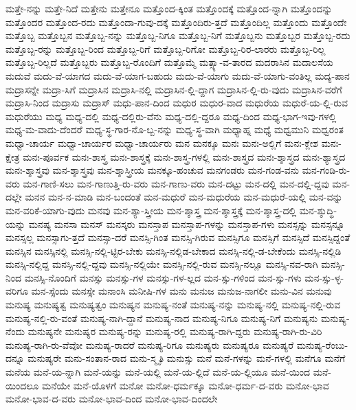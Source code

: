 {ಮತ್ತೇ-ನನ್ನು
ಮತ್ತೇ-ನಿದೆ
ಮತ್ತೇನು
ಮತ್ತೇನೂ
ಮತ್ತೊಂದ-ಕ್ಕಿಂತ
ಮತ್ತೊಂದಕ್ಕೆ
ಮತ್ತೊಂದ-ನ್ನಾಗಿ
ಮತ್ತೊಂದನ್ನು
ಮತ್ತೊಂದರ
ಮತ್ತೊಂದ-ರದು
ಮತ್ತೊಂದಾ-ಗುವು-ದಕ್ಕೆ
ಮತ್ತೊಂದಿರು-ತ್ತದೆ
ಮತ್ತೊಂದಿಲ್ಲ
ಮತ್ತೊಂದು
ಮತ್ತೊಂದೇ
ಮತ್ತೊಬ್ಬ
ಮತ್ತೊಬ್ಬನ
ಮತ್ತೊಬ್ಬ-ನನ್ನು
ಮತ್ತೊಬ್ಬ-ನಿಗೂ
ಮತ್ತೊಬ್ಬ-ನಿಗೆ
ಮತ್ತೊಬ್ಬನು
ಮತ್ತೊಬ್ಬರ
ಮತ್ತೊಬ್ಬ-ರದು
ಮತ್ತೊಬ್ಬ-ರನ್ನು
ಮತ್ತೊಬ್ಬ-ರಿಂದ
ಮತ್ತೊಬ್ಬ-ರಿಗೆ
ಮತ್ತೊಬ್ಬ-ರಿಗೋ
ಮತ್ತೊಬ್ಬ-ರಿರ-ಲಾರರು
ಮತ್ತೊಬ್ಬ-ರಿಲ್ಲ
ಮತ್ತೊಬ್ಬ-ರಿಲ್ಲದೆ
ಮತ್ತೊಬ್ಬರು
ಮತ್ತೊಬ್ಬ-ರೊಂದಿಗೆ
ಮತ್ತೊಮ್ಮೆ
ಮತ್ಸ್ಯಾ-ವ-ತಾರದ
ಮದರಾಸಿನ
ಮದಾಲಸೆಯ
ಮದುವೆ
ಮದು-ವೆ-ಯಾಗದ
ಮದು-ವೆ-ಯಾಗ-ಬಹುದು
ಮದು-ವೆ-ಯಾಗು
ಮದು-ವೆ-ಯಾಗು-ವಂತಿಲ್ಲ
ಮದ್ಯ-ಪಾನ
ಮದ್ರಾಸನ್ನೇ
ಮದ್ರಾ-ಸಿಗೆ
ಮದ್ರಾಸಿನ
ಮದ್ರಾಸಿ-ನಲ್ಲಿ
ಮದ್ರಾಸಿನ-ಲ್ಲಿ-ದ್ದಾಗ
ಮದ್ರಾಸಿನ-ಲ್ಲಿ-ರು-ವುದು
ಮದ್ರಾಸಿನ-ವರೆಗೆ
ಮದ್ರಾಸಿ-ನಿಂದ
ಮದ್ರಾಸು
ಮದ್ರಾಸ್
ಮಧು-ಪಾನ-ದಿಂದ
ಮಧುರ
ಮಧುರ-ವಾದ
ಮಧುರೆಯ
ಮಧುರೆ-ಯ-ಲ್ಲಿ-ರುವ
ಮಧುರೆಯು
ಮಧ್ಯ
ಮಧ್ಯ-ದಲ್ಲಿ
ಮಧ್ಯ-ದಲ್ಲಿರು-ವೆನು
ಮಧ್ಯ-ದಲ್ಲಿ-ದ್ದರೂ
ಮಧ್ಯ-ದಿಂದ
ಮಧ್ಯ-ಭಾಗ-ಇವು-ಗಳಲ್ಲಿ
ಮಧ್ಯ-ಮ-ವಾದು-ದೆಂದರೆ
ಮಧ್ಯ-ಸ್ಥ-ಗಾರ-ನೊ-ಬ್ಬ-ನನ್ನು
ಮಧ್ಯ-ಸ್ಥ-ವಾಗಿ
ಮಧ್ಯಾಹ್ನ
ಮಧ್ಯೆ
ಮಧ್ವಮುನಿ
ಮಧ್ವರಂತ
ಮಧ್ವಾ-ಚಾರ್ಯ
ಮಧ್ವಾ-ಚಾರ್ಯರ
ಮಧ್ವಾ-ಚಾರ್ಯರು
ಮನ
ಮನಕ್ಕೂ
ಮನಃ
ಮನಃ-ಅಲ್ಲಿಗೆ
ಮನಃ-ಕ್ಲೇಶ
ಮನಃ-ಕ್ಷೇತ್ರ
ಮನಃ-ಪೂರ್ವಕ
ಮನಃ-ಶಾಸ್ತ್ರ
ಮನಃ-ಶಾಸ್ತ್ರಕ್ಕೆ
ಮನಃ-ಶಾಸ್ತ್ರ-ಗಳಲ್ಲಿ
ಮನಃ-ಶಾಸ್ತ್ರದ
ಮನಃ-ಶ್ಶಾಸ್ತ್ರದ
ಮನಃ-ಶ್ಯಾಸ್ತ್ರದ
ಮನಃ-ಶ್ಶಾಸ್ತ್ರವು
ಮನ-ಶ್ಶಾಸ್ತ್ರವು
ಮನ-ಶ್ಶಾಸ್ತ್ರೀಯ
ಮನಕ್ಕೂ-ಹಂಚುವ
ಮನಗಂಡರು
ಮನ-ಗಂಡ-ವನು
ಮನ-ಗಂಡಿ-ರು-ವರು
ಮನ-ಗಾಣಿ-ಸಲು
ಮನ-ಗಾಣುತ್ತಿ-ರು-ವರು
ಮನ-ಗಾಣು-ವರು
ಮನ-ದಟ್ಟು
ಮನ-ದಲ್ಲಿ
ಮನ-ದಲ್ಲಿ-ದ್ದವು
ಮನ-ದಲ್ಲೇ
ಮನನ
ಮನ-ನ-ಮಾಡಿ
ಮನ-ಬಂದಂತೆ
ಮನ-ಮಧುರೆ
ಮನ-ಮಧುರೆಯ
ಮನ-ಮಧುರೆ-ಯಲ್ಲಿ
ಮನ-ವನ್ನು
ಮನ-ವರಿಕೆ-ಯಾಗು-ವುದು
ಮನವು
ಮನ-ಶ್ಯಾ-ಸ್ತ್ರೀಯ
ಮನ-ಶ್ಶಾಸ್ತ್ರ
ಮನ-ಶ್ಶಾಸ್ತ್ರಕ್ಕೆ
ಮನ-ಶ್ಶಾಸ್ತ್ರ-ದಲ್ಲಿ
ಮನ-ಶ್ಶುದ್ಧಿ-ಯನ್ನು
ಮನಷ್ಯ
ಮನಸಾ
ಮನಸ್
ಮನಸ್ಕರು
ಮನಸ್ತಾಪ
ಮನಸ್ತಾಪ-ಗಳನ್ನು
ಮನಸ್ತಾಪ-ಗಳು
ಮನಸ್ಸನ್ನು
ಮನಸ್ಸನ್ನೂ
ಮನಸ್ಸಲ್ಲ
ಮನಸ್ಸಾಗು-ತ್ತದೆ
ಮನಸ್ಸಾ-ದರೆ
ಮನಸ್ಸಿ-ಗಿಂತ
ಮನಸ್ಸಿ-ಗಿರುವ
ಮನಸ್ಸಿಗೂ
ಮನಸ್ಸಿಗೆ
ಮನಸ್ಸಿದೆ
ಮನಸ್ಸಿದ್ದಂತೆ
ಮನಸ್ಸಿನ
ಮನಸ್ಸಿನಲ್ಲಿ
ಮನಸ್ಸಿ-ನಲ್ಲಿ-ಟ್ಟಿರ-ಬೇಕು
ಮನಸ್ಸಿ-ನಲ್ಲಿಡ-ಬೇಕಾದ
ಮನಸ್ಸಿ-ನಲ್ಲಿ-ಡ-ಬೇಕೆಂದು
ಮನಸ್ಸಿ-ನಲ್ಲಿಡಿ
ಮನಸ್ಸಿ-ನಲ್ಲಿದ್ದ
ಮನಸ್ಸಿ-ನಲ್ಲಿ-ದ್ದವು
ಮನಸ್ಸಿ-ನಲ್ಲಿಯೇ
ಮನಸ್ಸಿ-ನಲ್ಲಿ-ರುವ
ಮನಸ್ಸಿ-ನಲ್ಲೂ
ಮನಸ್ಸಿ-ನವ-ರಾಗಿ
ಮನಸ್ಸಿ-ನಿಂದ
ಮನಸ್ಸಿ-ನೊಂದಿಗೆ
ಮನಸ್ಸು
ಮನಸ್ಸು-ಗಳ
ಮನಸ್ಸು-ಗಳ-ಲ್ಲದ
ಮನ-ಸ್ಸು-ಗಳಿಂದ
ಮನ-ಸ್ಸು-ಗಳು
ಮನ-ಸ್ಸು-ಳ್ಳ-ವರಿಗೂ
ಮನ-ಸ್ಸೆಂದು
ಮನಸ್ಸೇ
ಮನಾಂಸಿ
ಮನೀಷಿ-ಗಳ
ಮನು
ಮನುಜ
ಮನುಜ-ನಾಗಲೀ
ಮನು-ವಿನ
ಮನುವು
ಮನುಷ್ಯ
ಮನುಷ್ಯತ್ವ
ಮನುಷ್ಯತ್ವಂ
ಮನುಷ್ಯನ
ಮನುಷ್ಯ-ನಂತೆ
ಮನುಷ್ಯ-ನನ್ನು
ಮನುಷ್ಯ-ನಲ್ಲಿ
ಮನುಷ್ಯ-ನಲ್ಲಿ-ರುವ
ಮನುಷ್ಯ-ನಲ್ಲಿ-ರು-ವಂತೆ
ಮನುಷ್ಯ-ನಾಗಿ-ದ್ದಾನೆ
ಮನುಷ್ಯ-ನಾದ
ಮನುಷ್ಯ-ನಿಗೂ
ಮನುಷ್ಯ-ನಿಗೆ
ಮನುಷ್ಯನು
ಮನುಷ್ಯ-ನೆಂದು
ಮನುಷ್ಯನೇ
ಮನುಷ್ಯರ
ಮನುಷ್ಯ-ರನ್ನು
ಮನುಷ್ಯ-ರಲ್ಲಿ
ಮನುಷ್ಯ-ರಾಗಿ-ದ್ದರು
ಮನುಷ್ಯ-ರಾಗಿ-ರು-ವಿರಿ
ಮನುಷ್ಯ-ರಾಗಿ-ರು-ವೆವೋ
ಮನುಷ್ಯ-ರಾದರೆ
ಮನುಷ್ಯ-ರಿಗೂ
ಮನುಷ್ಯರು
ಮನುಷ್ಯರೂ
ಮನುಷ್ಯರೆ
ಮನುಷ್ಯ-ರೆಂಬು-ದನ್ನೂ
ಮನುಷ್ಯರೇ
ಮನು-ಸಂತಾನ-ರಾದ
ಮನು-ಸ್ಮೃತಿ
ಮನುಸ್ಸು
ಮನೆ
ಮನೆ-ಗಳನ್ನು
ಮನೆ-ಗಳಲ್ಲಿ
ಮನೆಗೂ
ಮನೆಗೆ
ಮನೆಯ
ಮನೆ-ಯ-ನ್ನಾಗಿ
ಮನೆ-ಯನ್ನು
ಮನೆ-ಯಲ್ಲಿ
ಮನೆ-ಯ-ಲ್ಲಿದೆ
ಮನೆ-ಯ-ಲ್ಲಿಯೂ
ಮನೆ-ಯಿಂದ
ಮನೆ-ಯಿಂದಲೂ
ಮನೆಯೇ
ಮನೆ-ಯೊಳಗೆ
ಮನೋ
ಮನೋ-ಧರ್ಮಕ್ಕೂ
ಮನೋ-ಧರ್ಮ-ದ-ವರು
ಮನೋ-ಭಾವ
ಮನೋ-ಭಾವ-ದ-ವರು
ಮನೋ-ಭಾವ-ದಿಂದ
ಮನೋ-ಭಾವ-ದಿಂದಲೇ
}
